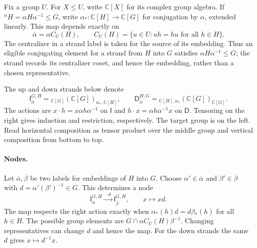 \documentclass[11pt,a4paper]{article}
\numberwithin{equation}{section}
\theoremstyle{definition}
\newcommand{\C}{\mathbb C}
\newcommand{\co}[1]{\overline{#1}}
\newcommand{\cg}[2]{{}^{#1}\!#2}
\newcommand{\I}{\mathsf I}
\newcommand{\D}{\mathsf D}
\begin{document}
Fix a group \(U\). For \(X\le U\), write \(\C[X]\) for its complex group algebra.
If \(\cg{\alpha}{H}=\alpha H\alpha^{-1}\le G\), write
\(\alpha_*:\C[H]\to \C[G]\) for conjugation by \(\alpha\), extended linearly.
This map depends exactly on
\[
 \bar\alpha=\alpha C_U(H),\qquad
 C_U(H)=\{u\in U:uh=hu\text{ for all }h\in H\}.
\]
The centralizer in a strand label is taken for the source of its
embedding.
Thus an eligible conjugating element for a strand from \(H\) into \(G\)
satisfies \(\alpha H\alpha^{-1}\le G\); the strand records its
centralizer coset, and hence the embedding, rather than a chosen
representative.

The up and down strands below denote
\[
 \I_{\co\alpha}^{G,H}={}_{\C[G]}(\C[G])_{\alpha_*,\C[H]},\qquad
 \D_{\co\alpha}^{H,G}={}_{\C[H],\alpha_*}(\C[G])_{\C[G]}.
\]
The actions are \(x\cdot h=x\alpha h\alpha^{-1}\) on \(\I\) and
\(h\cdot x=\alpha h\alpha^{-1}x\) on \(\D\). Tensoring on the right
gives induction and restriction, respectively. The target group
is on the left. Read horizontal composition as tensor product over
the middle group and vertical composition from bottom to top.

\begin{center}
\end{center}

\paragraph{Nodes.}
Let \(\co\alpha,\co\beta\) be two labels for embeddings of \(H\) into
\(G\). Choose \(\alpha'\in\co\alpha\) and \(\beta'\in\co\beta\) with
\(d=\alpha'(\beta')^{-1}\in G\). This determines a node
\[
 \I_{\co\alpha}^{G,H}\xrightarrow{\ \cdot d\ }\I_{\co\beta}^{G,H},
 \qquad x\longmapsto xd.
\]
The map respects the right action exactly when
\(\alpha_*(h)d=d\beta_*(h)\) for all \(h\in H\).
The possible group elements are \(G\cap\alpha C_U(H)\beta^{-1}\).
Changing representatives can change \(d\) and hence the map.
For the down strands the same \(d\) gives \(x\mapsto d^{-1}x\).
\end{document}
